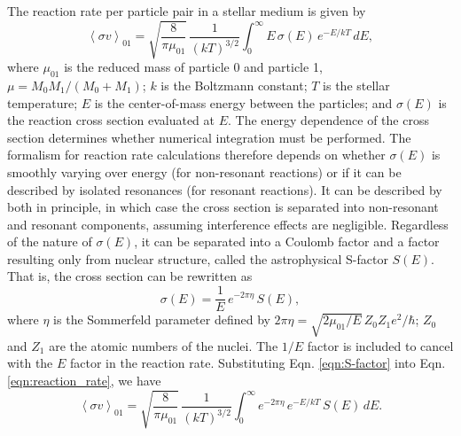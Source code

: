 The reaction rate per particle pair in a stellar medium is given by
\begin{equation} \label{eqn:reaction_rate}
\left\langle \sigma v \right\rangle_{01} = \sqrt{\frac{8}{\pi \mu_{01}}} \, \frac{1}{(kT)^{3/2}} \int_{0}^{\infty} E \, \sigma(E) \, e^{-E/kT} \, dE,
\end{equation}
where $\mu_{01}$ is the reduced mass of particle 0 and particle 1, $\mu = M_{0}M_{1}/(M_{0}+M_{1})$; $k$ is the Boltzmann constant; $T$ is the stellar temperature; $E$ is the center-of-mass energy between the particles; and $\sigma(E)$ is the reaction cross section evaluated at $E$. The energy dependence of the cross section determines whether numerical integration must be performed. The formalism for reaction rate calculations therefore depends on whether $\sigma(E)$ is smoothly varying over energy (for non-resonant reactions) or if it can be described by isolated resonances (for resonant reactions). It can be described by both in principle, in which case the cross section is separated into non-resonant and resonant components, assuming interference effects are negligible. Regardless of the nature of $\sigma(E)$, it can be separated into a Coulomb factor and a factor resulting only from nuclear structure, called the astrophysical S-factor $S(E)$. That is, the cross section can be rewritten as
\begin{equation} \label{eqn:S-factor}
\sigma(E) = \frac{1}{E} \, e^{-2 \pi \eta} \, S(E),
\end{equation}
where $\eta$ is the Sommerfeld parameter defined by $2 \pi \eta = \sqrt{2 \mu_{01} / E} \,  Z_{0} Z_{1} e^{2} / \hbar$; $Z_{0}$ and $Z_{1}$ are the atomic numbers of the nuclei. The $1/E$ factor is included to cancel with the $E$ factor in the reaction rate. Substituting Eqn. \ref{eqn:S-factor} into Eqn. \ref{eqn:reaction_rate}, we have
\begin{equation} \label{eqn:reaction_rate_S-factor}
\left\langle \sigma v \right\rangle_{01} = \sqrt{\frac{8}{\pi \mu_{01}}} \, \frac{1}{(kT)^{3/2}} \int_{0}^{\infty} e^{-2 \pi \eta} \, e^{-E/kT} \, S(E) \, dE.
\end{equation}

